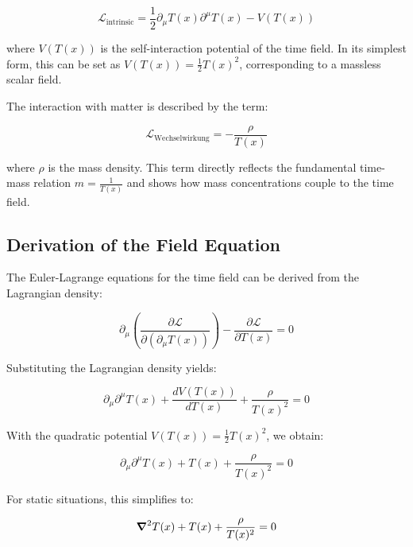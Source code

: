 \documentclass[12pt,a4paper]{article}
\newcommand{\Tfield}{T(x)}
\begin{document}
	\begin{equation}
		\mathcal{L}_{\text{intrinsic}} = \frac{1}{2} \partial_\mu \Tfield \partial^\mu \Tfield - V(\Tfield)
	\end{equation}
	
	where \(V(\Tfield)\) is the self-interaction potential of the time field. In its simplest form, this can be set as \(V(\Tfield) = \frac{1}{2} \Tfield^2\), corresponding to a massless scalar field.
	
	The interaction with matter is described by the term:
	
	\begin{equation}
		\mathcal{L}_{\text{Wechselwirkung}} = -\frac{\rho}{\Tfield}
	\end{equation}
	
	where \(\rho\) is the mass density. This term directly reflects the fundamental time-mass relation \(m = \frac{1}{\Tfield}\) and shows how mass concentrations couple to the time field.
	
	\subsection{Derivation of the Field Equation}
	The Euler-Lagrange equations for the time field can be derived from the Lagrangian density:
	
	\begin{equation}
		\partial_\mu \left( \frac{\partial \mathcal{L}}{\partial(\partial_\mu \Tfield)} \right) - \frac{\partial \mathcal{L}}{\partial \Tfield} = 0
	\end{equation}
	
	Substituting the Lagrangian density yields:
	
	\begin{equation}
		\partial_\mu \partial^\mu \Tfield + \frac{dV(\Tfield)}{d\Tfield} + \frac{\rho}{\Tfield^2} = 0
	\end{equation}
	
	With the quadratic potential \(V(\Tfield) = \frac{1}{2} \Tfield^2\), we obtain:
	
	\begin{equation}
		\partial_\mu \partial^\mu \Tfield + \Tfield + \frac{\rho}{\Tfield^2} = 0
	\end{equation}
	
	For static situations, this simplifies to:
	
	\begin{equation}
		\grad^2 \Tfield + \Tfield + \frac{\rho}{\Tfield^2} = 0
	\end{equation}
	
\end{document}
